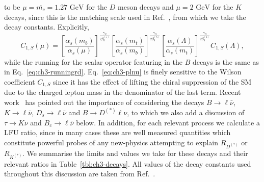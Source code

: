 to be $\mu = \overline{m_c} = 1.27 \text{ GeV}$ for the $D$ meson decays and $\mu = 2
\text{ GeV}$ for the $K$ decays, since this is the matching scale used in
Ref.~\cite{Aoki:2016frl}, from which we take the decay constants. Explicitly,
\begin{equation}
  C_{1,S} (\mu) = \left[\frac{\alpha_s(m_b)}{\alpha_s(\mu)} \right]^{\frac{\gamma_S}{2\beta_0^{(4)}}} \left[\frac{\alpha_s(m_t)}{\alpha_s(m_b)} \right]^{\frac{\gamma_S}{2\beta_0^{(5)}}} \left[\frac{\alpha_s(\Lambda)}{\alpha_s(m_t)} \right]^{\frac{\gamma_S}{2\beta_0^{(6)}}} C_{1,S}(\Lambda),
\end{equation}
while the running for the scalar operator featuring in the $B$ decays is the
same as in Eq.~\eqref{eq:ch3-runningrd}. Eq.~\eqref{eq:ch3-plnu} is finely sensitive to
the Wilson coefficient $C_{1,S}$ since it has the effect of lifting the chiral
suppression of the SM due to the charged lepton mass in the denominator of the
last term. Recent work~\cite{Becirevic:2016oho} has pointed out the importance
of considering the decays $B \to \ell \bar{\nu}$, $K \to \ell \bar{\nu}$, $D_s
\to \ell \bar{\nu}$ and $B \to D^{(*)} \ell \nu$, to which we also add a
discussion of $\tau \to K \nu$ and $B_c \to \ell \bar{\nu}$ below. In addition,
for each relevant process we calculate a LFU ratio, since in many cases these
are well measured quantities which constitute powerful probes of any new-physics
attempting to explain $R_{D^{(*)}}$ or $R_{K^{(*)}}$. We summarise the limits
and values we take for these decays and their relevant ratios in
Table~\ref{tbl:ch3-decays}. All values of the decay constants used throughout this
discussion are taken from Ref.~\cite{Aoki:2016frl}.

